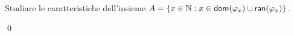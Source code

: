 \documentclass[runningheads,a4paper]{llncs}
\begin{document}
\begin{exercise}
Studiare le caratteristiche dell'insieme $A = \{x \in \mathbb{N} : x \in \mathsf{dom}(\varphi_x) \cup \mathsf{ran}(\varphi_x)\}$.
\end{exercise}

\begin{solution}

\qed
\end{solution}

%
\end{document}
